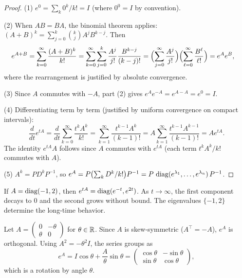 \documentclass[11pt,a4paper]{article}
\begin{document}
\begin{proof}
(1) $e^0 = \sum_k 0^k/k! = I$ (where $0^0 = I$ by convention).

(2) When $AB = BA$, the binomial theorem applies:
$(A + B)^k = \sum_{j=0}^k \binom{k}{j} A^j B^{k-j}$.  Then
\begin{align*}
  e^{A+B} &= \sum_{k=0}^\infty \frac{(A+B)^k}{k!}
  = \sum_{k=0}^\infty \sum_{j=0}^k \frac{A^j}{j!} \frac{B^{k-j}}{(k-j)!}
  = \Bigl(\sum_{j=0}^\infty \frac{A^j}{j!}\Bigr)
    \Bigl(\sum_{\ell=0}^\infty \frac{B^\ell}{\ell!}\Bigr)
  = e^A e^B,
\end{align*}
where the rearrangement is justified by absolute convergence.

(3) Since $A$ commutes with $-A$, part (2) gives
$e^A e^{-A} = e^{A-A} = e^0 = I$.

(4) Differentiating term by term (justified by uniform convergence on
compact intervals):
\[
  \frac{d}{dt} e^{tA} = \frac{d}{dt} \sum_{k=0}^\infty \frac{t^k A^k}{k!}
  = \sum_{k=1}^\infty \frac{t^{k-1} A^k}{(k-1)!}
  = A \sum_{k=1}^\infty \frac{t^{k-1} A^{k-1}}{(k-1)!}
  = A e^{tA}.
\]
The identity $e^{tA} A$ follows since $A$ commutes with $e^{tA}$
(each term $t^k A^k / k!$ commutes with $A$).

(5) $A^k = PD^kP^{-1}$, so
$e^A = P\bigl(\sum_k D^k/k!\bigr)P^{-1}
= P\,\operatorname{diag}(e^{\lambda_1}, \ldots, e^{\lambda_n})\,P^{-1}$.
\end{proof}

\begin{example}
\label{ex:exp_diagonal}
If $A = \operatorname{diag}(-1, 2)$, then
$e^{tA} = \operatorname{diag}(e^{-t}, e^{2t})$.  As $t \to \infty$, the first
component decays to $0$ and the second grows without bound.  The
eigenvalues $\{-1, 2\}$ determine the long-time behavior.
\end{example}

\begin{example}
\label{ex:exp_rotation}
Let $A = \begin{pmatrix} 0 & -\theta \\ \theta & 0 \end{pmatrix}$
for $\theta \in \mathbb{R}$.  Since $A$ is skew-symmetric ($A^\top = -A$),
$e^A$ is orthogonal.  Using $A^2 = -\theta^2 I$, the series groups as
\[
  e^A = I \cos\theta + \frac{A}{\theta}\sin\theta
  = \begin{pmatrix} \cos\theta & -\sin\theta \\ \sin\theta & \cos\theta \end{pmatrix},
\]
which is a rotation by angle $\theta$.
\end{example}
\end{document}

